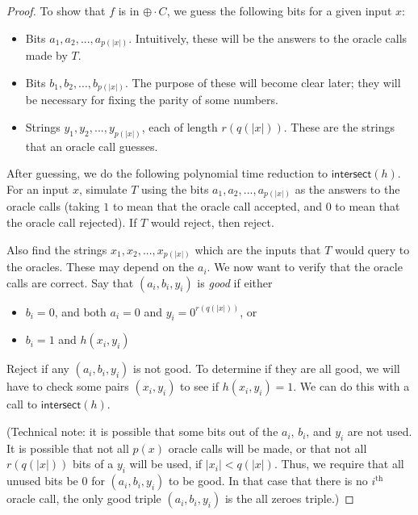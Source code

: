 \documentclass[11pt]{article}
\newcommand{\parity}{\oplus}
\newcommand{\intersect}{\textsf{intersect}}
\begin{document}
\begin{proof}
To show that $f$ is in $\parity \cdot C$, we guess the following bits for a given input $x$:
\begin{itemize}
\item Bits $a_1,a_2,...,a_{p(|x|)}$. Intuitively, these will be the answers to the oracle calls made by $T$.
\item Bits $b_1,b_2,...,b_{p(|x|)}$. The purpose of these will become clear later; they will be necessary for fixing the parity of some numbers.
\item Strings $y_1,y_2,...,y_{p(|x|)}$, each of length $r(q(|x|))$. These are the strings that an oracle call guesses.
\end{itemize}
After guessing, we do the following polynomial time reduction to $\intersect(h)$. For an input $x$, simulate $T$ using the bits $a_1,a_2,...,a_{p(|x|)}$ as the answers to the oracle calls (taking $1$ to mean that the oracle call accepted, and $0$ to mean that the oracle call rejected). If $T$ would reject, then reject.

Also find the strings $x_1,x_2,...,x_{p(|x|)}$ which are the inputs that $T$ would query to the oracles. These may depend on the $a_i$. We now want to verify that the oracle calls are correct. Say that $(a_i, b_i, y_i)$ is \emph{good} if either
\begin{itemize}
\item $b_i = 0$, and both $a_i = 0$ and $y_i = 0^{r(q(|x|))}$, or
\item $b_i = 1$ and $h(x_i, y_i)$
\end{itemize}
Reject if any $(a_i, b_i, y_i)$ is not good. To determine if they are all good, we will have to check some pairs $(x_i, y_i)$ to see if $h(x_i,y_i) = 1$. We can do this with a call to $\intersect(h)$.

(Technical note: it is possible that some bits out of the $a_i$, $b_i$, and $y_i$ are not used. It is possible that not all $p(x)$ oracle calls will be made, or that not all $r(q(|x|))$ bits of a $y_i$ will be used, if $|x_i| < q(|x|)$. Thus, we require that all unused bits be $0$ for $(a_i, b_i, y_i)$ to be good. In that case that there is no $i^\text{th}$ oracle call, the only good triple $(a_i, b_i, y_i)$ is the all zeroes triple.)


\end{proof}
\end{document}
